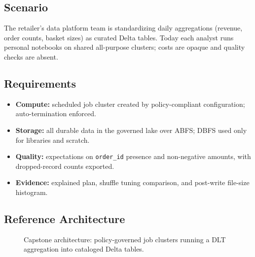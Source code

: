 \subsection*{Scenario}
The retailer's data platform team is standardizing daily aggregations (revenue, order counts, basket sizes) as curated Delta tables. Today each analyst runs personal notebooks on shared all-purpose clusters; costs are opaque and quality checks are absent.

\subsection*{Requirements}
\begin{itemize}
    \item \textbf{Compute:} scheduled job cluster created by policy-compliant configuration; auto-termination enforced.
    \item \textbf{Storage:} all durable data in the governed lake over ABFS; DBFS used only for libraries and scratch.
    \item \textbf{Quality:} expectations on \texttt{order\_id} presence and non-negative amounts, with dropped-record counts exported.
    \item \textbf{Evidence:} explained plan, shuffle tuning comparison, and post-write file-size histogram.
\end{itemize}

\subsection*{Reference Architecture}
\begin{figure}[H]
    \centering
    \caption{Capstone architecture: policy-governed job clusters running a DLT aggregation into cataloged Delta tables.}
    \label{fig:ch9-capstone-arch}
\end{figure}

